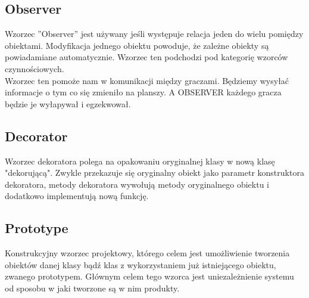 \documentclass[a4paper, 11pt]{article}
\begin{document}
	\subsection{Observer}
	Wzorzec ''Observer'' jest używany jeśli występuje relacja jeden do wielu pomiędzy obiektami. Modyfikacja jednego obiektu powoduje, że zależne obiekty są powiadamiane automatycznie. Wzorzec ten podchodzi pod kategorię wzorców czynnościowych.\\
Wzorzec ten pomoże nam w komunikacji między graczami. Będziemy wysyłać informacje o tym co się zmieniło na planszy. A OBSERVER każdego gracza będzie je wyłapywał i egzekwował.

\subsection{Decorator}
Wzorzec dekoratora polega na opakowaniu oryginalnej klasy w nową klasę "dekorującą". Zwykle przekazuje się oryginalny obiekt jako parametr konstruktora dekoratora, metody dekoratora wywołują metody oryginalnego obiektu i dodatkowo implementują nową funkcję.\\

\subsection{Prototype}
Konstrukcyjny wzorzec projektowy, którego celem jest umożliwienie tworzenia obiektów danej klasy bądź klas z wykorzystaniem już istniejącego obiektu, zwanego prototypem. Głównym celem tego wzorca jest uniezależnienie systemu od sposobu w jaki tworzone są w nim produkty.\\
\end{document}

